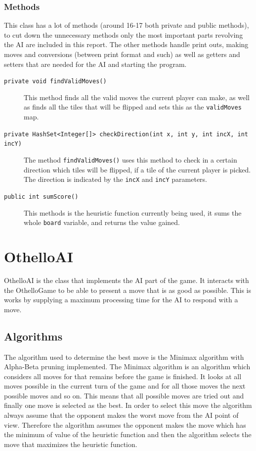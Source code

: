 \documentclass[a4paper]{article}
\begin{document}
\subsubsection{Methods}
This class has a lot of methods (around 16-17 both private and public methods), to cut down the unnecessary methods only the most important parts revolving the AI are included in this report. The other methods handle print outs, making moves and conversions (between print format and such) as well as getters and setters that are needed for the AI and starting the program.  
\begin{description}
\item[\texttt{private void findValidMoves()}] This method finds all the valid moves the current player can make, as well as finds all the tiles that will be flipped and sets this as the \texttt{validMoves} map.
\item[\texttt{private HashSet<Integer[]> checkDirection(int x, int y, int incX, int incY)}] The method \texttt{findValidMoves()} uses this method to check in a certain direction which tiles will be flipped, if a tile of the current player is picked. The direction is indicated by the \texttt{incX} and \texttt{incY} parameters.
\item[\texttt{public int sumScore()}] This methods is the heuristic function currently being used, it sums the whole \texttt{board} variable, and returns the value gained.
\end{description} 

\section{OthelloAI}
OthelloAI is the class that implements the AI part of the game. It interacts with the OthelloGame to be able to present a move that is as good as possible. This is works by supplying a maximum processing time for the AI to respond with a move. 

\subsection{Algorithms}
The algorithm used to determine the best move is the Minimax algorithm with Alpha-Beta pruning implemented. The Minimax algorithm is an algorithm which considers all moves for that remains before the game is finished. It looks at all moves possible in the current turn of the game and for all those moves the next possible moves and so on. This means that all possible moves are tried out and finally one move is selected as the best. In order to select this move the algorithm always assume that the opponent makes the worst move from the AI point of view. Therefore the algorithm assumes the opponent makes the move which has the minimum of value of the heuristic function and then the algorithm selects the move that maximizes the heuristic function.
\end{document}
